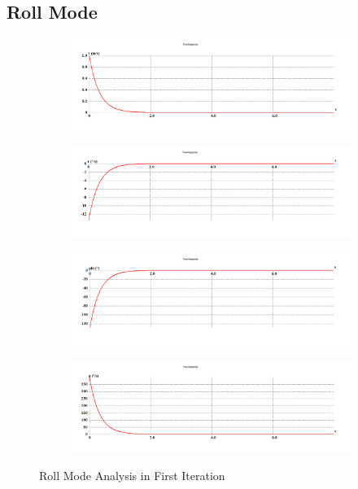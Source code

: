\subsection{Roll Mode}
\begin{figure}[H]
\begin{subfigure}{0.48\textwidth}
\includegraphics[width = \linewidth]{v.png}
\end{subfigure}
\begin{subfigure}{0.48\textwidth}
\includegraphics[width = \linewidth]{r.png}
\end{subfigure}
\medskip
\begin{subfigure}{0.48\textwidth}
\includegraphics[width = \linewidth]{phi.png}
\end{subfigure}
\begin{subfigure}{0.48\textwidth}
\includegraphics[width = \linewidth]{p.png}
\end{subfigure}
\caption{Roll Mode Analysis in First Iteration}
\end{figure}
